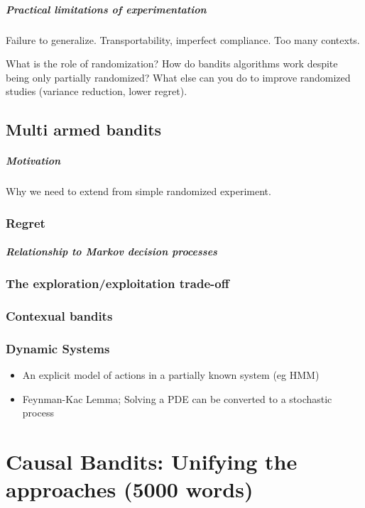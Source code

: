 \documentclass[11pt,a4paper,oneside]{book}
\begin{document}
\paragraph*{Practical limitations of experimentation} Failure to generalize. Transportability, imperfect compliance. Too many contexts.

What is the role of randomization? How do bandits algorithms work despite being only partially randomized? 
What else can you do to improve randomized studies (variance reduction, lower regret).

\section*{Multi armed bandits}
\paragraph*{Motivation} Why we need to extend from simple randomized experiment.

\subsection*{Regret}
\paragraph*{Relationship to Markov decision processes}
\subsection*{The exploration/exploitation trade-off}

\subsection*{Contexual bandits}


\subsection*{Dynamic Systems}
\begin{itemize}
\item An explicit model of actions in a partially known system (eg HMM)
\item Feynman-Kac Lemma; Solving a PDE can be converted to a stochastic process
\end{itemize}


\chapter*{Causal Bandits: Unifying the approaches (5000 words)}
\end{document}
